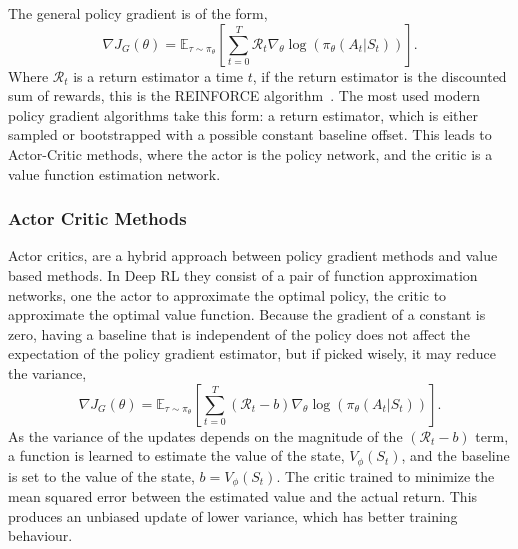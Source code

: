 The general policy gradient is of the form,
\begin{equation}
	\nabla J_G(\theta)  = \mathbb{E}_{\tau \sim \pi_\theta} \left[\sum_{t=0} ^ T \mathcal{R}_t \nabla_\theta \log(\pi_\theta(A_t|S_t))\right].
\end{equation}
Where $\mathcal{R}_t$ is a return estimator a time $t$, if the return estimator is the discounted sum of rewards, this is the REINFORCE algorithm~\cite{williams1992simple}.
The most used modern policy gradient algorithms take this form: a return estimator, which is either sampled or bootstrapped with a possible constant baseline offset. This leads to Actor-Critic methods, where the actor is the policy network, and the critic is a value function estimation network.

\subsubsection{Actor Critic Methods}\label{sec:Actor-Critic}
Actor critics, are a hybrid approach between policy gradient methods and value based methods. In Deep RL  they consist of a pair of function approximation networks, one the actor to approximate the optimal policy, the critic to approximate the optimal value function. Because the gradient of a constant is zero, having a baseline that is independent of the policy does not affect the expectation of the policy gradient estimator, but if picked wisely, it may reduce the variance,
\begin{equation}
	\nabla J_G(\theta)  = \mathbb{E}_{\tau \sim \pi_\theta} \left[\sum_{t=0} ^ T (\mathcal{R}_t - b) \nabla_\theta \log(\pi_\theta(A_t|S_t))\right].
\end{equation}
As the variance of the updates depends on the magnitude of the $(\mathcal{R}_t - b)$ term, a function is learned to estimate the value of the state, $V_\phi(S_t)$, and the baseline is set to the value of the state, $b = V_\phi(S_t)$. The critic trained to minimize the mean squared error between the estimated value and the actual return. This produces an unbiased update of lower variance, which has better training behaviour\cite{sutton2018reinforcement}.

